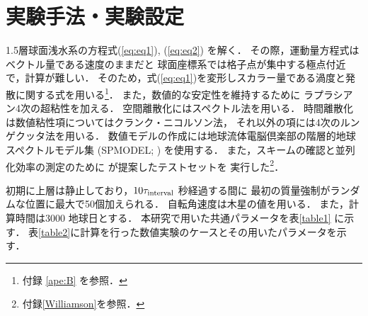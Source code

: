 \documentclass[a4j,12pt,openbib,oneside]{jreport}
\begin{document}
\section{実験手法・実験設定}
\label{sec:model2}
1.5層球面浅水系の方程式(\ref{eq:eq1}), (\ref{eq:eq2}) を解く．
その際，運動量方程式はベクトル量である速度のままだと
球面座標系では格子点が集中する極点付近で，計算が難しい．
そのため，式(\ref{eq:eq1})を変形しスカラー量である渦度と発散に関する式を用いる\footnote{付録 \ref{ape:B} を参照．}．
%
また，数値的な安定性を維持するために
ラプラシアン4次の超粘性を加える．
%
空間離散化にはスペクトル法を用いる．
時間離散化は数値粘性項についてはクランク・ニコルソン法，
それ以外の項には4次のルンゲクッタ法を用いる．
%
数値モデルの作成には地球流体電脳倶楽部の階層的地球スペクトルモデル集
(SPMODEL; \citealp{spmodel2006, spmodel2013}) を使用する．
また，スキームの確認と並列化効率の測定のために
\cite{Williamson1992} が提案したテストセットを
実行した\footnote{付録\ref{Williamson}を参照．}．

初期に上層は静止しており，$10 \tau_{{\rm{interval}}}$ 秒経過する間に
最初の質量強制がランダムな位置に最大で50個加えられる．
%
自転角速度は木星の値を用いる．
また，計算時間は3000 地球日とする．
%
本研究で用いた共通パラメータを表\ref{table1} に示す．
表\ref{table2}に計算を行った数値実験のケースとその用いたパラメータを示す．
\end{document}
